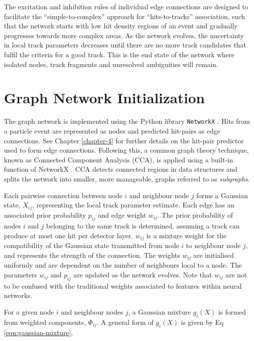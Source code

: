 The excitation and inhibition rules of individual edge connections are designed to facilitate the “simple-to-complex” approach for “hits-to-tracks” association, such that the network starts with low hit density regions of an event and gradually progresses towards more complex areas. As the network evolves, the uncertainty in local track parameters decreases until there are no more track candidates that fulfil the criteria for a good track. This is the end state of the network where isolated nodes, track fragments and unresolved ambiguities will remain.



\section{Graph Network Initialization}
\label{gnn-network-initialization}

The graph network is implemented using the Python library \texttt{NetworkX} \cite{SciPyProceedings_11}. Hits from a particle event are represented as nodes and predicted hit-pairs as edge connections. See Chapter \ref{chapter-4} for further details on the hit-pair predictor used to form edge connections. Following this, a common graph theory technique, known as Connected Component Analysis (CCA), is applied using a built-in function of NetworkX \cite{networkx}. CCA detects connected regions in data structures and splits the network into smaller, more manageable, graphs referred to as \textit{subgraphs}. 

Each pairwise connection between node $i$ and neighbour node $j$ forms a Gaussian state, $X_{ij}$, representing the local track parameter estimate. Each edge has an associated prior probability $p_{ij}$ and edge weight $w_{ij}$. The prior probability of nodes $i$ and $j$ belonging to the same track is determined, assuming a track can produce at most one hit per detector layer. $w_{ij}$ is a mixture weight for the compatibility of the Gaussian state transmitted from node $i$ to neighbour node $j$, and represents the strength of the connection. The weights $w_{ij}$ are initialised uniformly and are dependent on the number of neighbours local to a node. The parameters $w_{ij}$ and $p_{ij}$ are updated as the network evolves. Note that $w_{ij}$ are not to be confused with the traditional weights associated to features within neural networks. 

For a given node $i$ and neighbour nodes $j$, a Gaussian mixture $g_i(X)$ is formed from weighted components, $\Phi_{ij}$. A general form of $g_i(X)$ is given by Eq \eqref{eqn:gaussian-mixture},


